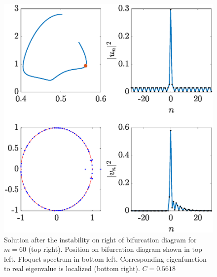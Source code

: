 \documentclass{article}
\begin{document}
\begin{figure}[H]
    \centering
    \includegraphics[width=12cm]{leftafterinstabilityR}
    \caption{Solution after the instability on right of bifurcation diagram for $m=60$ (top right). Position on bifurcation diagram shown in top left. Floquet spectrum in bottom left. Corresponding eigenfunction to real eigenvalue is localized (bottom right). $C = 0.5618$}
    \label{fig:leftinstabR}
\end{figure}
\end{document}
